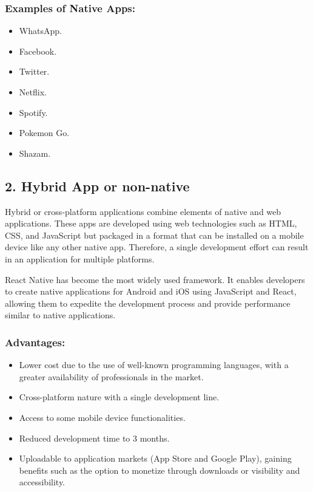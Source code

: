 \documentclass{article}
\begin{document}
\subsubsection*{Examples of Native Apps:}
\begin{itemize}
    \item WhatsApp.
    \item Facebook.
    \item Twitter.
    \item Netflix.
    \item Spotify.
    \item Pokemon Go.
    \item Shazam.
\end{itemize}

\subsection*{2. Hybrid App or non-native}

Hybrid or cross-platform applications combine elements of native and web applications. These apps are developed using web technologies such as HTML, CSS, and JavaScript but packaged in a format that can be installed on a mobile device like any other native app. Therefore, a single development effort can result in an application for multiple platforms.

React Native has become the most widely used framework. It enables developers to create native applications for Android and iOS using JavaScript and React, allowing them to expedite the development process and provide performance similar to native applications.

\subsubsection*{Advantages:}
\begin{itemize}
    \item Lower cost due to the use of well-known programming languages, with a greater availability of professionals in the market.
    \item Cross-platform nature with a single development line.
    \item Access to some mobile device functionalities.
    \item Reduced development time to 3 months.
    \item Uploadable to application markets (App Store and Google Play), gaining benefits such as the option to monetize through downloads or visibility and accessibility.
\end{itemize}
\end{document}
